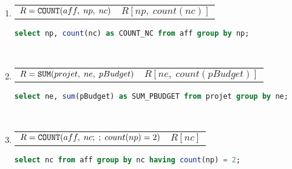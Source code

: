 \begin{enumerate}
	\item 
			\begin{tabular}{p{8cm}p{4cm}}
	$R = \acount(aff,\; np,\; nc)$  & $R[np,\; count(nc)]$
			\end{tabular}
	\begin{lstlisting}[language=SQL, numbers=none]
select np, count(nc) as COUNT_NC from aff group by np;
	\end{lstlisting}
	 ~
	\item 
			\begin{tabular}{p{8cm}p{4cm}}
	$R = \asum(projet,\; ne,\; pBudget)$  & $R[ne,\; count(pBudget)]$
			\end{tabular}
	\begin{lstlisting}[language=SQL, numbers=none]
select ne, sum(pBudget) as SUM_PBUDGET from projet group by ne;
	\end{lstlisting}
	 ~
	\item 
			\begin{tabular}{p{8cm}p{4cm}}
	$R = \acount(aff,\; nc;\; ;\; count(np) = 2)$ & $R[nc]$
			\end{tabular}
	\begin{lstlisting}[language=SQL, numbers=none]
select nc from aff group by nc having count(np) = 2;
	\end{lstlisting}
	\end{enumerate}
